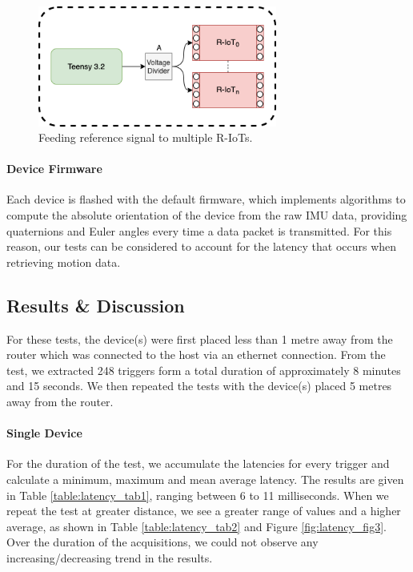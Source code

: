 \begin{figure}[htbp]
  \centering
    \includegraphics[width=0.7\textwidth]{Chapters/Figures/technical/Latency/figure2.png}
    \caption{Feeding reference signal to multiple R-IoTs.}
    \label{fig:latency_fig2}
\end{figure}

\paragraph{Device Firmware}
Each device is flashed with the default firmware, which implements algorithms to compute the absolute orientation of the device from the raw IMU data, providing quaternions and Euler angles every time a data packet is transmitted. For this reason, our tests can be considered to account for the latency that occurs when retrieving motion data.

\subsection{Results \& Discussion}

For these tests, the device(s) were first placed less than 1 metre away from the router which was connected to the host via an ethernet connection. From the test, we extracted 248 triggers form a total duration of approximately 8 minutes and 15 seconds. We then repeated the tests with the device(s) placed 5 metres away from the router.

\paragraph{Single Device}
For the duration of the test, we accumulate the latencies for every trigger and calculate a minimum, maximum and mean average latency. The results are given in Table \ref{table:latency_tab1}, ranging between 6 to 11 milliseconds. When we repeat the test at greater distance, we see a greater range of values and a higher average, as shown in Table \ref{table:latency_tab2} and Figure \ref{fig:latency_fig3}. Over the duration of the acquisitions, we could not observe any increasing/decreasing trend in the results.

